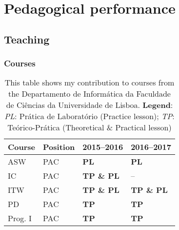 \section{Pedagogical performance}

\subsection{Teaching}

\subsubsection{Courses}
\vspace{-1.5\baselineskip}
\begin{table}[H]
\centering
\caption{This table shows my contribution to courses from the Departamento de Informática da Faculdade de Ciências da Universidade de Lisboa. \hfill\break
\textbf{Legend}:
\textit{PL}: Prática de Laboratório (Practice lesson);
\textit{TP}: Teórico-Prática (Theoretical \& Practical lesson)}
\label{tab:courses}
\begin{tabular}{llll}
\toprule
\bfseries Course & \bfseries Position & \bfseries 2015--2016 & \bfseries 2016--2017 \\
\midrule
ASW     & PAC & \bfseries PL & \bfseries PL \\
IC      & PAC & \bfseries TP \& PL & -- \\
ITW     & PAC & \bfseries TP \& PL & \bfseries TP \& PL \\
PD      & PAC & \bfseries TP & \bfseries TP \\
Prog. I & PAC & \bfseries TP & \bfseries TP \\
\bottomrule
\end{tabular}
\end{table}

